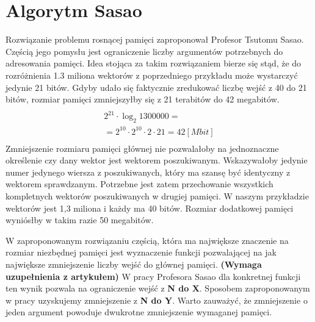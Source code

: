 \section{Algorytm Sasao}
Rozwiązanie problemu rosnącej pamięci zaproponował Profesor Tsutomu Sasao.
Częścią jego pomysłu jest ograniczenie liczby argumentów potrzebnych do adresowania pamięci.
Idea stojąca za takim rozwiązaniem bierze się stąd, że do rozróżnienia 1.3 miliona wektorów z poprzedniego przykładu może wystarczyć jedynie 21 bitów.
Gdyby udało się faktycznie zredukować liczbę wejść z 40 do 21 bitów, rozmiar pamięci zmniejszyłby się z 21 terabitów do 42 megabitów.
\begin{multline} \\
2^{21} \cdot \log_2 1300000 = \\
= 2^{10} \cdot 2^{10} \cdot 2 \cdot 21 = 42 [Mbit] \\
\end{multline}
Zmniejszenie rozmiaru pamięci głównej nie pozwalałoby na jednoznaczne określenie czy dany wektor jest wektorem poszukiwanym.
Wskazywałoby jedynie numer jedynego wiersza z poszukiwanych, który ma szansę być identyczny z wektorem sprawdzanym.
Potrzebne jest zatem przechowanie wszystkich kompletnych wektorów poszukiwanych w drugiej pamięci.
W naszym przykładzie wektorów jest 1,3 miliona i każdy ma 40 bitów.
Rozmiar dodatkowej pamięci wyniósłby w takim razie 50 megabitów.

W zaproponowanym rozwiązaniu częścią, która ma największe znaczenie na rozmiar niezbędnej pamięci jest wyznaczenie funkcji pozwalającej na jak największe zmniejszenie liczby wejść do głównej pamięci.
\textbf{(Wymaga uzupełnienia z artykułem)} W pracy Profesora Sasao dla konkretnej funkcji ten wynik pozwala na ograniczenie wejść z \textbf{N do X}.
Sposobem zaproponowanym w pracy uzyskujemy zmniejszenie z \textbf{N do Y}.
Warto zauważyć, że zmniejszenie o jeden argument powoduje dwukrotne zmniejszenie wymaganej pamięci.
